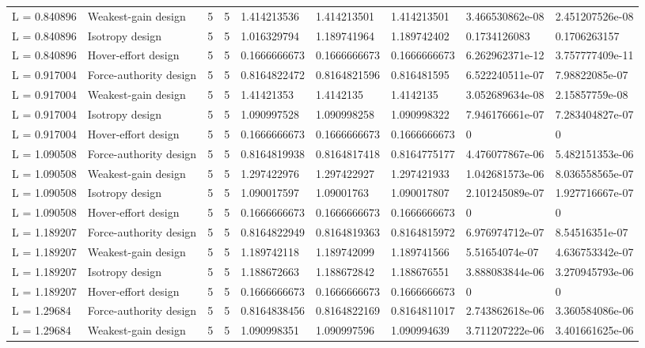 \begin{tabular}{@{}lllllllll@{}}
L = 0.840896 & Weakest-gain design & 5 & 5 & 1.414213536 & 1.414213501 & 1.414213501 & 3.466530862e-08 & 2.451207526e-08 \\
L = 0.840896 & Isotropy design & 5 & 5 & 1.016329794 & 1.189741964 & 1.189742402 & 0.1734126083 & 0.1706263157 \\
L = 0.840896 & Hover-effort design & 5 & 5 & 0.1666666673 & 0.1666666673 & 0.1666666673 & 6.262962371e-12 & 3.757777409e-11 \\
L = 0.917004 & Force-authority design & 5 & 5 & 0.8164822472 & 0.8164821596 & 0.816481595 & 6.522240511e-07 & 7.98822085e-07 \\
L = 0.917004 & Weakest-gain design & 5 & 5 & 1.41421353 & 1.4142135 & 1.4142135 & 3.052689634e-08 & 2.15857759e-08 \\
L = 0.917004 & Isotropy design & 5 & 5 & 1.090997528 & 1.090998258 & 1.090998322 & 7.946176661e-07 & 7.283404827e-07 \\
L = 0.917004 & Hover-effort design & 5 & 5 & 0.1666666673 & 0.1666666673 & 0.1666666673 & 0 & 0 \\
L = 1.090508 & Force-authority design & 5 & 5 & 0.8164819938 & 0.8164817418 & 0.8164775177 & 4.476077867e-06 & 5.482151353e-06 \\
L = 1.090508 & Weakest-gain design & 5 & 5 & 1.297422976 & 1.297422927 & 1.297421933 & 1.042681573e-06 & 8.036558565e-07 \\
L = 1.090508 & Isotropy design & 5 & 5 & 1.090017597 & 1.09001763 & 1.090017807 & 2.101245089e-07 & 1.927716667e-07 \\
L = 1.090508 & Hover-effort design & 5 & 5 & 0.1666666673 & 0.1666666673 & 0.1666666673 & 0 & 0 \\
L = 1.189207 & Force-authority design & 5 & 5 & 0.8164822949 & 0.8164819363 & 0.8164815972 & 6.976974712e-07 & 8.54516351e-07 \\
L = 1.189207 & Weakest-gain design & 5 & 5 & 1.189742118 & 1.189742099 & 1.189741566 & 5.51654074e-07 & 4.636753342e-07 \\
L = 1.189207 & Isotropy design & 5 & 5 & 1.188672663 & 1.188672842 & 1.188676551 & 3.888083844e-06 & 3.270945793e-06 \\
L = 1.189207 & Hover-effort design & 5 & 5 & 0.1666666673 & 0.1666666673 & 0.1666666673 & 0 & 0 \\
L = 1.29684 & Force-authority design & 5 & 5 & 0.8164838456 & 0.8164822169 & 0.8164811017 & 2.743862618e-06 & 3.360584086e-06 \\
L = 1.29684 & Weakest-gain design & 5 & 5 & 1.090998351 & 1.090997596 & 1.090994639 & 3.711207222e-06 & 3.401661625e-06 \\

\end{tabular}
